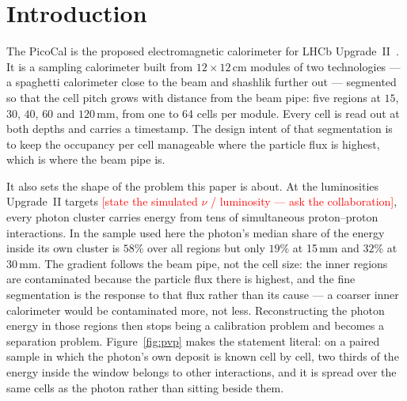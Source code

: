 \documentclass[11pt,a4paper]{article}
\newcommand{\seff}{\ensuremath{\sigma_{\mathrm{eff}}}}
\newcommand{\todo}[1]{\textcolor{red}{[#1]}}
\begin{document}
\begin{abstract}
error $0.16$ cells), the window is re-cut around it, a second pass
measures. On the development protocol the two-stage ensemble reads
$0.0378$ against $0.0388$, better in every one of $400$ paired resamples;
under cross-validation the same construction does not reproduce that gain,
while the auxiliary head is worth about $1\%$ under both protocols. We
report both measurements. A directly measured
data-scaling curve, $\seff \propto N^{-0.18}$ over four within-protocol
subsample points, predicts that tripling the simulated sample would bring
the aggregate to $\approx 0.033$, leaving training data as the only open
lever. The tripled-sample value is an extrapolation beyond the measured
range and is labelled as such.
\end{abstract}

\section{Introduction}

The PicoCal is the proposed electromagnetic calorimeter for LHCb
Upgrade~II~\cite{lhcbftdr}. It is a sampling calorimeter built from
$12 \times 12$\,cm modules of two technologies --- a spaghetti calorimeter
close to the beam and shashlik further out --- segmented so that the cell
pitch grows with distance from the beam pipe: five regions at $15$, $30$,
$40$, $60$ and $120$\,mm, from one to 64 cells per module. Every cell is read
out at both depths and carries a timestamp. The design intent of that
segmentation is to keep the occupancy per cell manageable where the particle
flux is highest, which is where the beam pipe is.

It also sets the shape of the problem this paper is about. At the luminosities
Upgrade~II targets
\todo{state the simulated $\nu$ / luminosity --- ask the collaboration},
every photon cluster carries energy from tens of simultaneous
proton--proton interactions. In the sample used here the photon's median share
of the energy inside its own cluster is $58\%$ over all regions but only
$19\%$ at 15\,mm and $32\%$ at 30\,mm. The gradient follows the beam pipe, not
the cell size: the inner regions are contaminated because the particle flux
there is highest, and the fine segmentation is the response to that flux
rather than its cause --- a coarser inner calorimeter would be contaminated
more, not less. Reconstructing the photon energy in those regions then stops
being a calibration problem and becomes a separation problem. Figure~\ref{fig:pvp} makes the
statement literal: on a paired sample in which the photon's own deposit is
known cell by cell, two thirds of the energy inside the window belongs to
other interactions, and it is spread over the same cells as the photon
rather than sitting beside them.
\end{document}
